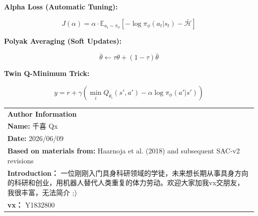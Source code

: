 \documentclass[12pt,a4paper]{article}
\theoremstyle{noteplain}
\theoremstyle{noteexercise}
\begin{document}
\textbf{Alpha Loss (Automatic Tuning):}

$$J(\alpha) = \alpha \cdot \mathbb{E}_{a_t \sim \pi_\phi}[-\log\pi_\phi(a_t|s_t) - \bar{\mathcal{H}}]$$



\textbf{Polyak Averaging (Soft Updates):}

$$\bar{\theta} \leftarrow \tau \theta + (1 - \tau)\bar{\theta}$$



\textbf{Twin Q-Minimum Trick:}

$$y = r + \gamma \left(\min_i Q_{\bar{\theta}_i}(s', a') - \alpha \log\pi_\phi(a'|s')\right)$$



\begin{center}
  \begin{tabular}{p{15cm}}
    \hline
    \textbf{\large Author Information} \\
    \textbf{Name:} 千喜 Qx \\
    \textbf{Date:} 2026/06/09 \\
    \textbf{Based on materials from:} Haarnoja et al. (2018) and subsequent SAC-v2 revisions \\
    \textbf{Introduction：} 一位刚刚入门具身科研领域的学徒，未来想长期从事具身方向的科研和创业，用机器人替代人类重复的体力劳动。欢迎大家加我vx交朋友，我很丰富，无法简介 ;) \\
    \textbf{vx：} Y1832800 \\
    \hline
  \end{tabular}
\end{center}
\end{document}
